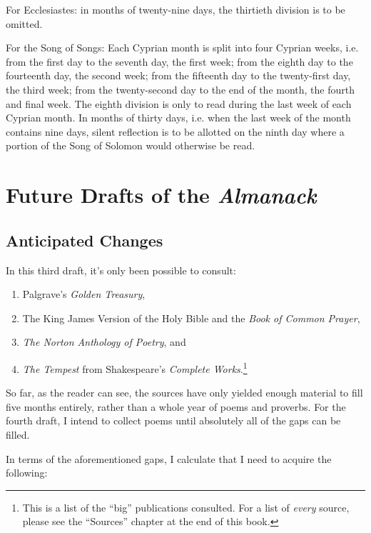 \documentclass[0main.tex]{subfiles}
\begin{document}
For Ecclesiastes: in months of twenty-nine days, the thirtieth division is to be omitted.

For the Song of Songs: Each Cyprian month is split into four Cyprian weeks, i.e. from the first day to the seventh day, the first week; from the eighth day to the fourteenth day, the second week; from the fifteenth day to the twenty-first day, the third week; from the twenty-second day to the end of the month, the fourth and final week. The eighth division is only to read during the last week of each Cyprian month. In months of thirty days, i.e. when the last week of the month contains nine days, silent reflection is to be allotted on the ninth day where a portion of the Song of Solomon would otherwise be read.

\chapter*{Future Drafts of the \emph{Almanack}}
\renewcommand*{\theHsection}{ch4.\the\value{section}}
\setcounter{section}{0}

\section{Anticipated Changes}

In this third draft, it's only been possible to consult: 

\begin{enumerate}
\item{Palgrave's \emph{Golden Treasury},}
\item{The King James Version of the Holy Bible and the \emph{Book of Common Prayer},}
\item{\emph{The Norton Anthology of Poetry}, and}
\item{\emph{The Tempest} from Shakespeare's \emph{Complete Works}.\footnote{This is a list of the ``big'' publications consulted. For a list of \emph{every} source, please see the ``Sources'' chapter at the end of this book.}}
\end{enumerate}

So far, as the reader can see, the sources have only yielded enough material to fill five months entirely, rather than a whole year of poems and proverbs. For the fourth draft, I intend to collect poems until absolutely all of the gaps can be filled.

In terms of the aforementioned gaps, I calculate that I need to acquire the following:
\end{document}
